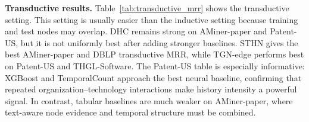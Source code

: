 \begin{table}[t]
\centering
\caption{ The best result is in bold, and the second best is underlined.}
\label{tab:inductive_mrr}
\scriptsize
\setlength{\tabcolsep}{4pt}
\end{table}
\textbf{Transductive results.} Table~\ref{tab:transductive_mrr} shows the transductive setting. 
This setting is usually easier than the inductive setting because training and test nodes may overlap. 
DHC remains strong on AMiner-paper and Patent-US, but it is not uniformly best after adding stronger baselines. 
STHN gives the best AMiner-paper and DBLP transductive MRR, while TGN-edge performs best on Patent-US and THGL-Software. 
The Patent-US table is especially informative: XGBoost and TemporalCount approach the best neural baseline, confirming that repeated organization--technology interactions make history intensity a powerful signal. 
In contrast, tabular baselines are much weaker on AMiner-paper, where text-aware node evidence and temporal structure must be combined. 
